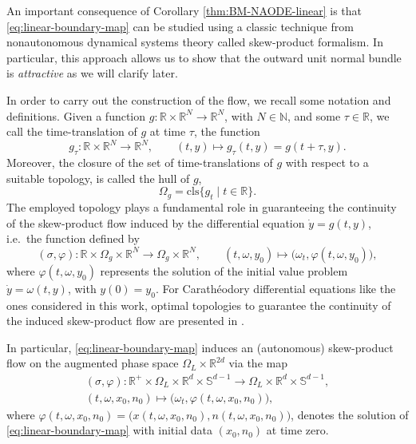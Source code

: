 \documentclass[reqno]{amsart}
\theoremstyle{definition}
\numberwithin{equation}{section}
\newcommand{\N}{\mathbb{N}}
\newcommand{\R}{\mathbb{R}}
\begin{document}
An important consequence of Corollary \ref{thm:BM-NAODE-linear} is that \eqref{eq:linear-boundary-map} can be studied using a classic technique from nonautonomous dynamical systems theory called skew-product formalism. In particular, this approach allows us to show that the outward unit normal bundle is \emph{attractive} as we will clarify later.
\smallskip

In order to carry out the construction of the flow, we recall some notation and definitions. Given a function $g:\R\times \R^N\to\R^N$, with $N\in\N$, and some $\tau \in\R$, we call the time-translation of $g$ at time $\tau$, the function 
\[
g_\tau:\R\times \R^N\to\R^N,\qquad (t,y)\mapsto g_\tau(t,y)=g(t+\tau,y). 
\]
Moreover, the closure of the set of time-translations of $g$ with respect to a suitable topology, is called the hull of $g$, 
\[
\Omega_{g}=\mathrm{cls}\{g_t\mid  t\in\R\}.
\]
The employed topology plays a fundamental role in guaranteeing the continuity of the skew-product flow induced by the differential equation $\dot y =g(t,y)$, i.e.~the function defined by
\[
(\sigma,\varphi): \R\times \Omega_{g}\times \R^N\to\Omega_{g}\times \R^N,\qquad (t,\omega,y_0)\mapsto\big(\omega_t, \varphi(t,\omega,y_0)\big),
\]
where $\varphi(t,\omega,y_0)$ represents the solution of the initial value problem $\dot y= \omega(t,y)$, with $y(0)=y_0$. 
For Carath\'eodory differential equations like the ones considered in this work, optimal topologies to guarantee the continuity of the induced skew-product flow are presented in \cite{longo2018topologies,longo2017topologies,longo2019weak}.
\smallskip

In particular, \eqref{eq:linear-boundary-map} induces an (autonomous) skew-product flow on the augmented phase space $\Omega_{L}\times \R^{2d}$ via the map
\begin{equation}\label{skew-product-linear} 
\begin{split}
(\sigma,\varphi):\R^+\times\Omega_L\times\R^d\times \mathbb S^{d-1}\to \Omega_L\times\R^d\times \mathbb S^{d-1},\\
(t,\omega,x_0,n_0)\mapsto\big(\omega_t, \varphi(t,\omega,x_0,n_0)\big),
\end{split}
\end{equation}
where $\varphi(t,\omega,x_0,n_0)=\big(x(t,\omega,x_0,n_0),n(t,\omega,x_0,n_0)\big)$, denotes the solution of \eqref{eq:linear-boundary-map} with initial data $(x_0,n_0)$ at time zero.\smallskip
\end{document}
